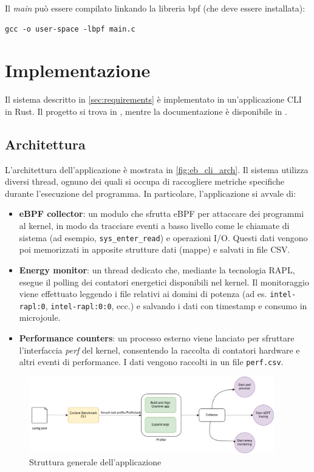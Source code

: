 \documentclass{article}
\begin{document}
Il \textit{main} può essere compilato linkando la libreria bpf (che deve essere installata):

\begin{verbatim}
gcc -o user-space -lbpf main.c
\end{verbatim}

\clearpage
\section{Implementazione}
Il sistema descritto in \cref{sec:requirements} è implementato in un'applicazione CLI in Rust. Il progetto si trova in \cite{eb-repo}, mentre la documentazione è disponibile in \cite{eb-docs}.
\subsection{Architettura}
L'architettura dell'applicazione è mostrata in \cref{fig:eb_cli_arch}. Il sistema utilizza diversi thread, ognuno dei quali si occupa di raccogliere metriche specifiche durante l'esecuzione del programma. In particolare, l'applicazione si avvale di:
\begin{itemize}
  \item \textbf{eBPF collector}: un modulo che sfrutta eBPF per attaccare dei programmi al kernel, in modo da tracciare eventi a basso livello come le chiamate di sistema (ad esempio, \texttt{sys\_enter\_read}) e operazioni I/O. Questi dati vengono poi memorizzati in apposite strutture dati (mappe) e salvati in file CSV.
  \item \textbf{Energy monitor}: un thread dedicato che, mediante la tecnologia RAPL, esegue il polling dei contatori energetici disponibili nel kernel. Il monitoraggio viene effettuato leggendo i file relativi ai domini di potenza (ad es. \texttt{intel-rapl:0}, \texttt{intel-rapl:0:0}, ecc.) e salvando i dati con timestamp e consumo in microjoule.
  \item \textbf{Performance counters}: un processo esterno viene lanciato per sfruttare l'interfaccia \textit{perf} del kernel, consentendo la raccolta di contatori hardware e altri eventi di performance. I dati vengono raccolti in un file \texttt{perf.csv}.
\end{itemize}

\begin{figure}
  \begin{center}
    \includegraphics[width=0.95\textwidth]{./figures/ch3/eb_cli_arch.png}
  \end{center}
  \caption{Struttura generale dell'applicazione}\label{fig:eb_cli_arch.png}
\end{figure}
\end{document}
